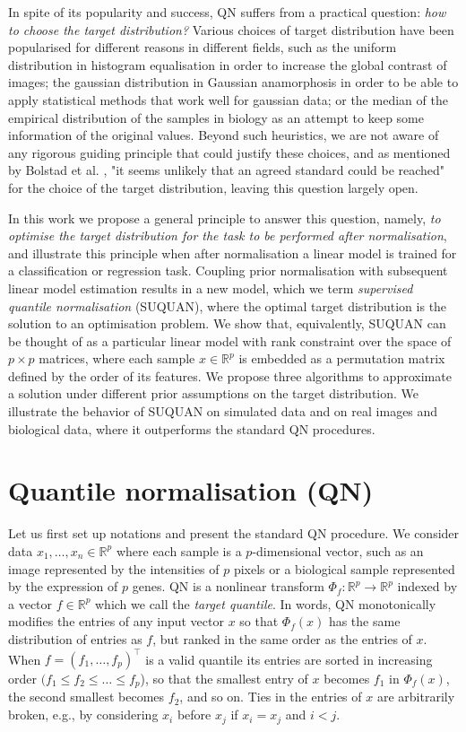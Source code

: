 \documentclass{article}
\newcommand{\RR}{\mathbb{R}} %
\begin{document}
In spite of its popularity and success, QN suffers from a practical question: \emph{how to choose the target distribution?} Various choices of target distribution have been popularised for different reasons in different fields, such as the uniform distribution in histogram equalisation in order to increase the global contrast of images; the gaussian distribution in Gaussian anamorphosis in order to be able to apply statistical methods that work well for gaussian data; or the median of the empirical distribution of the samples in biology as an attempt to keep some information of the original values. Beyond such heuristics, we are not aware of any rigorous guiding principle that could justify these choices, and as mentioned by Bolstad et al. \cite{Bolstad2003comparison}, "it seems unlikely that an agreed standard could be reached" for the choice of the target distribution, leaving this question largely open.

In this work we propose a general principle to answer this question, namely, \emph{to optimise the target distribution for the task to be performed after normalisation}, and illustrate this principle when after normalisation a linear model is trained for a classification or regression task. Coupling prior normalisation with subsequent linear model estimation results in a new model, which we term \emph{supervised quantile normalisation} (SUQUAN), where the optimal target distribution is the solution to an optimisation problem. We show that, equivalently, SUQUAN can be thought of as a particular linear model with rank constraint over the space of $p\times p$ matrices, where each sample $x\in\RR^p$ is embedded as a permutation matrix defined by the order of its features. We propose three algorithms to approximate a solution under different prior assumptions on the target distribution. We illustrate the behavior of SUQUAN on simulated data and on real images and biological data, where it outperforms the standard QN procedures.

\section{Quantile normalisation (QN)}

Let us first set up notations and present the standard QN procedure. We consider data $x_1, \ldots, x_n \in\RR^p$ where each sample is a $p$-dimensional vector, such as an image represented by the intensities of $p$ pixels or a biological sample represented by the expression of $p$ genes. QN is a nonlinear transform $\Phi_f : \RR^p \rightarrow \RR^p$ indexed by a vector $f\in\RR^p$ which we call the \emph{target quantile}. In words, QN monotonically modifies the entries of any input vector $x$ so that $\Phi_f(x)$ has the same distribution of entries as $f$, but ranked in the same order as the entries of $x$. When $f=(f_1,\ldots,f_p)^\top$ is a valid quantile its entries  are sorted in increasing order $(f_1\leq f_2 \leq \ldots \leq f_p$), so that the smallest entry of $x$ becomes $f_1$ in $\Phi_f(x)$, the second smallest becomes $f_2$, and so on. Ties in the entries of $x$ are arbitrarily broken, e.g., by considering $x_i$ before $x_j$ if $x_i=x_j$ and $i<j$.
\end{document}
